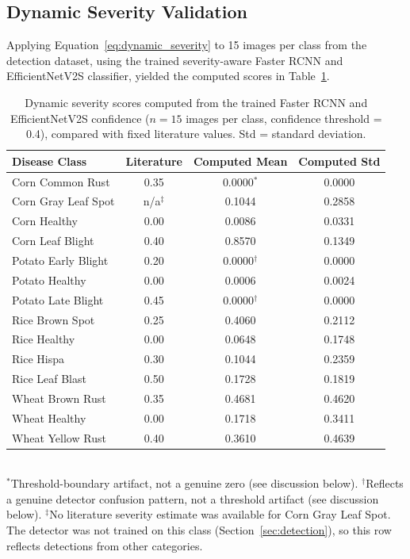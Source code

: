 \subsection{Dynamic Severity Validation}
\label{sec:results_dynamic}

Applying Equation~\ref{eq:dynamic_severity} to 15 images per class
from the detection dataset, using the trained
severity-aware Faster RCNN and EfficientNetV2S classifier, yielded the
computed scores in Table~\ref{tab:dynamic_severity}.

\begin{table}[!htbp]
\centering
\caption{Dynamic severity scores computed from the trained Faster RCNN
  and EfficientNetV2S confidence ($n = 15$ images per class,
  confidence threshold = 0.4), compared with fixed literature values.
  Std = standard deviation.}
\label{tab:dynamic_severity}
\setlength{\tabcolsep}{5pt}
{\small
\begin{tabular}{lccc}
\toprule
\textbf{Disease Class} & \textbf{Literature} &
\textbf{Computed Mean} & \textbf{Computed Std}\\
\midrule
Corn Common Rust    & 0.35 & 0.0000$^{*}$ & 0.0000\\
Corn Gray Leaf Spot & n/a$^{\ddagger}$ & 0.1044 & 0.2858\\
Corn Healthy        & 0.00 & 0.0086 & 0.0331\\
Corn Leaf Blight    & 0.40 & 0.8570 & 0.1349\\
Potato Early Blight & 0.20 & 0.0000$^{\dagger}$ & 0.0000\\
Potato Healthy      & 0.00 & 0.0006 & 0.0024\\
Potato Late Blight  & 0.45 & 0.0000$^{\dagger}$ & 0.0000\\
Rice Brown Spot     & 0.25 & 0.4060 & 0.2112\\
Rice Healthy        & 0.00 & 0.0648 & 0.1748\\
Rice Hispa          & 0.30 & 0.1044 & 0.2359\\
Rice Leaf Blast     & 0.50 & 0.1728 & 0.1819\\
Wheat Brown Rust    & 0.35 & 0.4681 & 0.4620\\
Wheat Healthy       & 0.00 & 0.1718 & 0.3411\\
Wheat Yellow Rust   & 0.40 & 0.3610 & 0.4639\\
\bottomrule
\end{tabular}
}
\\[4pt]
\footnotesize $^{*}$Threshold-boundary artifact, not a genuine zero
(see discussion below). $^{\dagger}$Reflects a genuine detector
confusion pattern, not a threshold artifact (see discussion below).
$^{\ddagger}$No literature severity estimate was available for Corn Gray
Leaf Spot. The detector was not trained on this class
(Section~\ref{sec:detection}), so this row reflects detections from
other categories.
\end{table}

